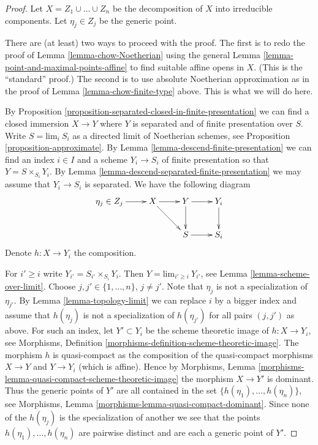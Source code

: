 \begin{proof}
Let $X = Z_1 \cup \ldots \cup Z_n$ be the decomposition of $X$
into irreducible components. Let $\eta_j \in Z_j$ be the generic point.

\medskip\noindent
There are (at least) two ways to proceed with the proof.
The first is to redo the proof of Lemma \ref{lemma-chow-Noetherian}
using the general Lemma \ref{lemma-point-and-maximal-points-affine}
to find suitable affine opens in $X$. (This is the ``standard'' proof.)
The second is to use absolute Noetherian approximation as in
the proof of Lemma \ref{lemma-chow-finite-type} above.
This is what we will do here.

\medskip\noindent
By Proposition \ref{proposition-separated-closed-in-finite-presentation}
we can find a closed immersion $X \to Y$ where $Y$ is separated
and of finite presentation over $S$. 
Write $S = \text{lim}_i\ S_i$ as a directed limit of Noetherian schemes, see
Proposition \ref{proposition-approximate}. By
Lemma \ref{lemma-descend-finite-presentation} we can
find an index $i \in I$ and a scheme $Y_i \to S_i$ of finite presentation
so that $Y = S \times_{S_i} Y_i$.
By Lemma \ref{lemma-descend-separated-finite-presentation}
we may assume that $Y_i \to S_i$ is separated.
We have the following diagram
$$
\xymatrix{
\eta_j \in Z_j \ar[r] & X \ar[r] \ar[rd] & Y \ar[r] \ar[d] & Y_i \ar[d] \\
& & S \ar[r] & S_i
}
$$
Denote $h : X \to Y_i$ the composition.

\medskip\noindent
For $i' \geq i$ write $Y_{i'} = S_{i'} \times_{S_i} Y_i$.
Then $Y = \text{lim}_{i' \geq i}\ Y_{i'}$, see
Lemma \ref{lemma-scheme-over-limit}.
Choose $j, j' \in \{1, \ldots, n\}$, $j \not = j'$.
Note that $\eta_j$ is not a specialization of $\eta_{j'}$.
By Lemma \ref{lemma-topology-limit}
we can replace $i$ by a bigger index and assume
that $h(\eta_j)$ is not a specialization of $h(\eta_{j'})$
for all pairs $(j, j')$ as above.
For such an index, let
$Y' \subset Y_i$ be the scheme theoretic image of
$h : X \to Y_i$, see
Morphisms, Definition \ref{morphisms-definition-scheme-theoretic-image}.
The morphism $h$ is quasi-compact as the composition of the quasi-compact
morphisms $X \to Y$ and $Y \to Y_i$ (which is affine).
Hence by
Morphisms, Lemma \ref{morphisms-lemma-quasi-compact-scheme-theoretic-image}
the morphism $X \to Y'$ is dominant. Thus the generic points
of $Y'$ are all contained in the set
$\{h(\eta_1), \ldots, h(\eta_n)\}$, see
Morphisms, Lemma \ref{morphisms-lemma-quasi-compact-dominant}.
Since none of the $h(\eta_j)$ is the specialization of another
we see that the points $h(\eta_1), \ldots, h(\eta_n)$ are pairwise
distinct and are each a generic point of $Y'$.


\end{proof}
